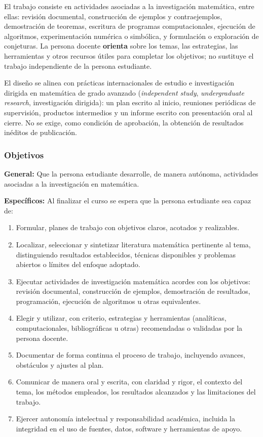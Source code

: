 \begin{refsection}
El trabajo consiste en actividades asociadas a la investigación matemática, entre ellas: revisión documental, construcción de ejemplos y contraejemplos, demostración de teoremas, escritura de programas computacionales, ejecución de algoritmos, experimentación numérica o simbólica, y formulación o exploración de conjeturas. La persona docente \textbf{orienta} sobre los temas, las estrategias, las herramientas y otros recursos útiles para completar los objetivos; no sustituye el trabajo independiente de la persona estudiante.

El diseño se alinea con prácticas internacionales de estudio e investigación dirigida en matemática de grado avanzado (\emph{independent study}, \emph{undergraduate research}, investigación dirigida): un plan escrito al inicio, reuniones periódicas de supervisión, productos intermedios y un informe escrito con presentación oral al cierre. No se exige, como condición de aprobación, la obtención de resultados inéditos de publicación.

\subsubsection*{Objetivos}

\textbf{General:} Que la persona estudiante desarrolle, de manera autónoma, actividades asociadas a la investigación en matemática.

\textbf{Específicos:} Al finalizar el curso se espera que la persona estudiante sea capaz de:

\begin{enumerate}
\item Formular, planes de trabajo con objetivos claros, acotados y realizables.
\item Localizar, seleccionar y sintetizar literatura matemática pertinente al tema, distinguiendo resultados establecidos, técnicas disponibles y problemas abiertos o límites del enfoque adoptado.
\item Ejecutar actividades de investigación matemática acordes con los objetivos: revisión documental, construcción de ejemplos, demostración de resultados, programación, ejecución de algoritmos u otras equivalentes.
\item Elegir y utilizar, con criterio, estrategias y herramientas (analíticas, computacionales, bibliográficas u otras) recomendadas o validadas por la persona docente.
\item Documentar de forma continua el proceso de trabajo, incluyendo avances, obstáculos y ajustes al plan.
\item Comunicar de manera oral y escrita, con claridad y rigor, el contexto del tema, los métodos empleados, los resultados alcanzados y las limitaciones del trabajo.
\item Ejercer autonomía intelectual y responsabilidad académica, incluida la integridad en el uso de fuentes, datos, software y herramientas de apoyo.
\end{enumerate}


\end{refsection}
